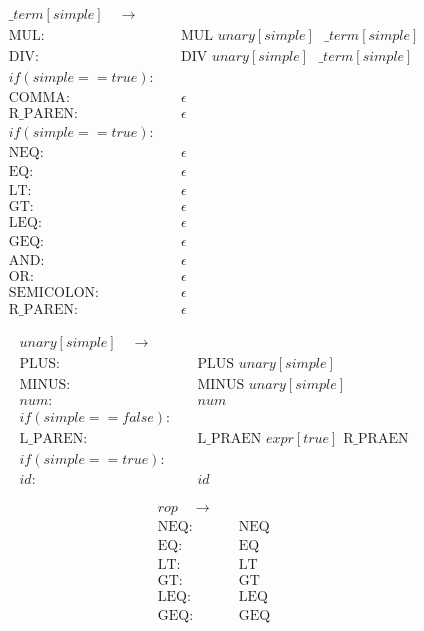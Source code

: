 \documentclass{article}
\begin{document}
\begin{align*}
\_term[simple] \quad  \to & \quad\\
\text{MUL}: &\quad \text{MUL }  unary[simple] \text{ } \_term[simple] \\
\text{DIV}: &\quad \text{DIV }  unary[simple] \text{ } \_term[simple] \\
if (simple == true): &\\
\text{COMMA} : & \quad \epsilon \\
\text{R\_PAREN} : & \quad \epsilon \\
if (simple == true): &\\
\text{NEQ} : & \quad \epsilon \\
\text{EQ} : & \quad \epsilon \\
\text{LT} : & \quad \epsilon \\
\text{GT} : & \quad \epsilon \\
\text{LEQ} : & \quad \epsilon \\
\text{GEQ} : & \quad \epsilon \\
\text{AND} : & \quad \epsilon \\
\text{OR} : & \quad \epsilon \\
\text{SEMICOLON} : & \quad \epsilon \\
\text{R\_PAREN} :  & \quad \epsilon
\end{align*}

\begin{align*}
unary[simple] \quad  \to & \quad\\
\text{PLUS}: & \quad \text{PLUS } unary[simple]\\
\text{MINUS}: & \quad \text{MINUS } unary[simple]\\
num: & \quad num \\
if (simple == false): &\\
\text{L\_PAREN}: & \quad \text{L\_PRAEN } expr[true] \text{ R\_PRAEN}\\
if (simple == true): &\\
id: & \quad id
\end{align*}

\begin{align*}
rop \quad  \to & \quad\\
\text{NEQ} : & \quad \text{NEQ} \\
\text{EQ} : & \quad \text{EQ} \\
\text{LT} : & \quad \text{LT} \\
\text{GT} : & \quad \text{GT} \\
\text{LEQ} : & \quad \text{LEQ} \\
\text{GEQ} : & \quad \text{GEQ}
\end{align*}
\end{document}
